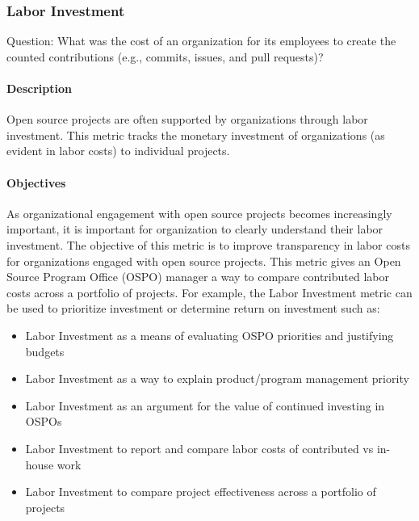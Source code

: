 \hypertarget{labor-investment}{%
\subsubsection{Labor Investment}\label{labor-investment}}

Question: What was the cost of an organization for its employees to
create the counted contributions (e.g., commits, issues, and pull
requests)?

\hypertarget{description}{%
\paragraph{Description}\label{description}}

Open source projects are often supported by organizations through labor
investment. This metric tracks the monetary investment of organizations
(as evident in labor costs) to individual projects.

\hypertarget{objectives}{%
\paragraph{Objectives}\label{objectives}}

As organizational engagement with open source projects becomes
increasingly important, it is important for organization to clearly
understand their labor investment. The objective of this metric is to
improve transparency in labor costs for organizations engaged with open
source projects. This metric gives an Open Source Program Office (OSPO)
manager a way to compare contributed labor costs across a portfolio of
projects. For example, the Labor Investment metric can be used to
prioritize investment or determine return on investment such as:

\begin{itemize}
\tightlist
\item
  Labor Investment as a means of evaluating OSPO priorities and
  justifying budgets
\item
  Labor Investment as a way to explain product/program management
  priority
\item
  Labor Investment as an argument for the value of continued investing
  in OSPOs
\item
  Labor Investment to report and compare labor costs of contributed vs
  in-house work
\item
  Labor Investment to compare project effectiveness across a portfolio
  of projects
\end{itemize}

